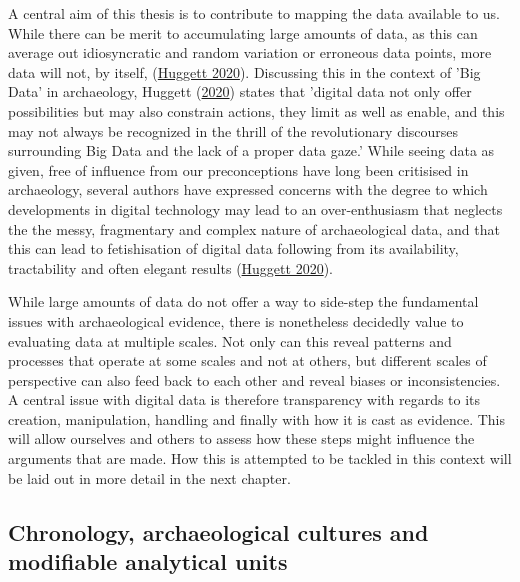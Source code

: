 \documentclass[
  a4paper,
  oneside]{uiophdthesis}
\begin{document}
A central aim of this thesis is to contribute to mapping the data available to us. While there can be merit to accumulating large amounts of data, as this can average out idiosyncratic and random variation or erroneous data points, more data will not, by itself, (\protect\hyperlink{ref-huggett2020}{Huggett 2020}). Discussing this in the context of 'Big Data' in archaeology, Huggett (\protect\hyperlink{ref-huggett2020}{2020}) states that 'digital data not only offer possibilities but may also constrain actions, they limit as well as enable, and this may not always be recognized in the thrill of the revolutionary discourses surrounding Big Data and the lack of a proper data gaze.' While seeing data as given, free of influence from our preconceptions have long been critisised in archaeology, several authors have expressed concerns with the degree to which developments in digital technology may lead to an over-enthusiasm that neglects the the messy, fragmentary and complex nature of archaeological data, and that this can lead to fetishisation of digital data following from its availability, tractability and often elegant results (\protect\hyperlink{ref-huggett2020}{Huggett 2020}).

While large amounts of data do not offer a way to side-step the fundamental issues with archaeological evidence, there is nonetheless decidedly value to evaluating data at multiple scales. Not only can this reveal patterns and processes that operate at some scales and not at others, but different scales of perspective can also feed back to each other and reveal biases or inconsistencies. A central issue with digital data is therefore transparency with regards to its creation, manipulation, handling and finally with how it is cast as evidence. This will allow ourselves and others to assess how these steps might influence the arguments that are made. How this is attempted to be tackled in this context will be laid out in more detail in the next chapter.

\hypertarget{chronology-archaeological-cultures-and-modifiable-analytical-units}{%
\subsection{Chronology, archaeological cultures and modifiable analytical units}\label{chronology-archaeological-cultures-and-modifiable-analytical-units}}
\end{document}
